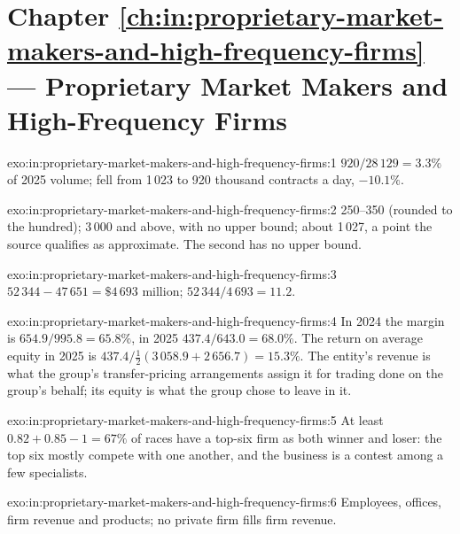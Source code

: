\section*{Chapter \ref{ch:in:proprietary-market-makers-and-high-frequency-firms} --- Proprietary Market Makers and High-Frequency Firms}

\begin{solution}{exo:in:proprietary-market-makers-and-high-frequency-firms:1}
$920/28\,129=3.3\%$ of 2025 volume;  fell from 1\,023 to 920 thousand contracts a day, $-10.1\%$.
\end{solution}

\begin{solution}{exo:in:proprietary-market-makers-and-high-frequency-firms:2}
250--350 (rounded to the hundred); 3\,000 and above, with no upper bound; about 1\,027, a point the source qualifies as
approximate. The second has no upper bound.
\end{solution}

\begin{solution}{exo:in:proprietary-market-makers-and-high-frequency-firms:3}
$52\,344-47\,651=\$4\,693$ million; $52\,344/4\,693=11.2$.
\end{solution}

\begin{solution}{exo:in:proprietary-market-makers-and-high-frequency-firms:4}
In 2024 the margin is $654.9/995.8=65.8\%$, in 2025 $437.4/643.0=68.0\%$. The return on average equity in 2025 is
$437.4/\tfrac12(3\,058.9+2\,656.7)=15.3\%$. The entity's revenue is what the group's transfer-pricing arrangements
assign it for trading done on the group's behalf; its equity is what the group chose to leave in it.
\end{solution}

\begin{solution}{exo:in:proprietary-market-makers-and-high-frequency-firms:5}
At least $0.82+0.85-1=67\%$ of races have a top-six firm as both winner and loser: the top six mostly compete with one
another, and the business is a contest among a few specialists.
\end{solution}

\begin{solution}{exo:in:proprietary-market-makers-and-high-frequency-firms:6}
Employees, offices, firm revenue and products; no private firm fills firm revenue.
\end{solution}

